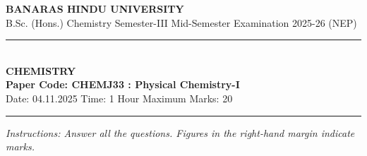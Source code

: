 \documentclass[11pt,a4paper]{article}
\begin{document}
\begin{center}
  {\large\bfseries BANARAS HINDU UNIVERSITY}\\[2pt]
  {\normalsize B.Sc. (Hons.) Chemistry Semester-III Mid-Semester Examination 2025-26 (NEP)}\\[6pt]
  \rule{0.8\linewidth}{0.5pt}\\[6pt]
  {\large\bfseries CHEMISTRY}\\[4pt]
  {\large\bfseries Paper Code: CHEMJ33 : Physical Chemistry-I}\\[4pt]
  {\normalsize Date: 04.11.2025 \hfill Time: 1 Hour \hfill Maximum Marks: 20}
\end{center}

\rule{\linewidth}{0.4pt}
\smallskip

\noindent \textit{Instructions: Answer all the questions. Figures in the right-hand margin indicate marks.}

\bigskip
\end{document}

